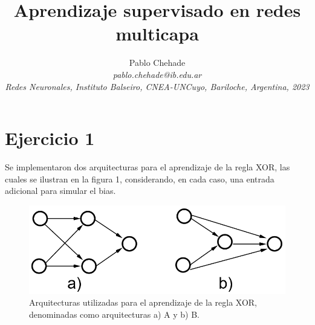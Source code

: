\documentclass[aps,prb,twocolumn,superscriptaddress,floatfix,longbibliography]{revtex4-2}
\newcounter{para}
\begin{document}
\newcommand{\mytitle}{Aprendizaje supervisado en redes multicapa}

\title{\mytitle}

\author{Pablo Chehade \\
    \small \textit{pablo.chehade@ib.edu.ar} \\
    \small \textit{Redes Neuronales, Instituto Balseiro, CNEA-UNCuyo, Bariloche, Argentina, 2023} \\}
    
\maketitle

\section*{Ejercicio 1}

Se implementaron dos arquitecturas para el aprendizaje de la regla XOR, las cuales se ilustran en la figura 1, considerando, en cada caso, una entrada adicional para simular el bias.

\begin{figure}[h]
    \includegraphics[clip=true,width=\columnwidth]{ej1_arquitectura.png}
    \caption{Arquitecturas utilizadas para el aprendizaje de la regla XOR, denominadas como arquitecturas a) A y b) B.}
     \label{fig:ej1_arquitectura}
\end{figure}
\end{document}
